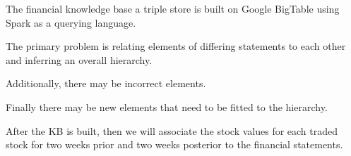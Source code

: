 

\cite{Punnoose2012-kt}
The financial knowledge base a triple store is built on Google BigTable using Spark as a querying language.

The primary problem is relating elements of differing statements to each other and inferring an overall hierarchy.

Additionally, there may be incorrect elements.

Finally there may be new elements that need to be fitted to the hierarchy.

After the KB is built, then we will associate the stock values for each traded stock for two weeks prior and two weeks posterior to the financial statements.